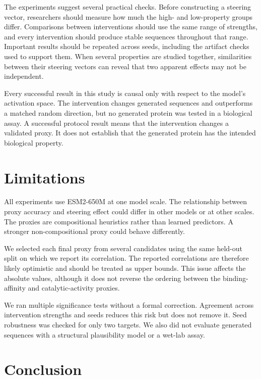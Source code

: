 \documentclass{article}
\begin{document}
The experiments suggest several practical checks. Before constructing a
steering vector, researchers should measure how much the high- and
low-property groups differ. Comparisons between interventions should use
the same range of strengths, and every intervention should produce
stable sequences throughout that range. Important results should be
repeated across seeds, including the artifact checks used to support
them. When several properties are studied together, similarities between
their steering vectors can reveal that two apparent effects may not be
independent.

Every successful result in this study is causal only with respect to the
model's activation space. The intervention changes generated sequences
and outperforms a matched random direction, but no generated protein was
tested in a biological assay. A successful protocol result means that
the intervention changes a validated proxy. It does not establish that
the generated protein has the intended biological property.

\section{Limitations}

All experiments use ESM2-650M at one model scale. The relationship
between proxy accuracy and steering effect could differ in other models
or at other scales. The proxies are compositional heuristics rather than
learned predictors. A stronger non-compositional proxy could behave
differently.

We selected each final proxy from several candidates using the same
held-out split on which we report its correlation. The reported
correlations are therefore likely optimistic and should be treated as
upper bounds. This issue affects the absolute values, although it does
not reverse the ordering between the binding-affinity and
catalytic-activity proxies.

We ran multiple significance tests without a formal correction.
Agreement across intervention strengths and seeds reduces this risk but
does not remove it. Seed robustness was checked for only two targets.
We also did not evaluate generated sequences with a structural
plausibility model or a wet-lab assay.

\section{Conclusion}
\end{document}
